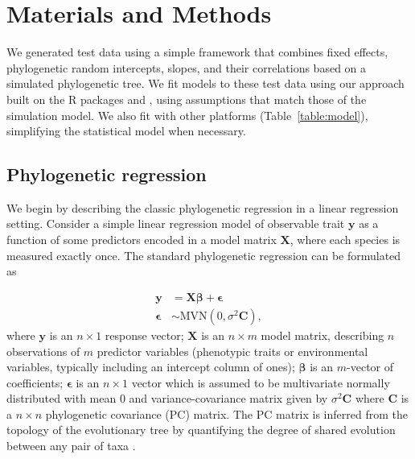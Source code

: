 \documentclass[12pt]{article}
\begin{document}
\section*{Materials and Methods}

\newcommand{\bX}{{\mathbf X}}
\newcommand{\bbeta}{{\boldsymbol \beta}}
\newcommand{\bmu}{{\boldsymbol \mu}}
\newcommand{\bY}{{\mathbf y}}  %
\newcommand{\bC}{{\mathbf C}}
\newcommand{\bZ}{{\mathbf Z}}
\newcommand{\bb}{{\mathbf b}}
\newcommand{\besp}{{\boldsymbol \epsilon}}
\newcommand{\bSigma}{{\boldsymbol \Sigma}}

We generated test data using a simple framework that combines fixed effects, phylogenetic random intercepts, slopes, and their correlations based on a simulated phylogenetic tree.
We fit models to these test data using our approach built on the R packages  \citep{bates2015fitting} and  \citep{brooks2017glmmTMB}, using assumptions that match those of the simulation model. We also fit with other platforms (Table~\ref{table:model}), simplifying the statistical model when necessary.

\subsection*{Phylogenetic regression}

We begin by describing the classic phylogenetic regression in a linear regression setting.
Consider a simple linear regression model of observable trait $\bY$ as a function of some predictors encoded in a model matrix $\bX$, where each species is measured exactly once. 
The standard phylogenetic regression can be formulated as


\begin{equation}
\begin{aligned}
\bY & = \bX \bbeta + \besp  \\
\besp & \sim \textrm{MVN}(0,\sigma^{2} \bC), 
\label{eq:gls}
\end{aligned}
\end{equation}
where $\bY$ is an $n \times 1$ response vector; $\bX$ is an $n \times m$ model matrix, describing $n$ observations of $m$ predictor variables (phenotypic traits or environmental variables, typically including an intercept column of ones); $\bbeta$ is an $m$-vector of coefficients; $\besp$ is an $n \times 1$ vector which is assumed to be multivariate normally distributed with mean $0$ and variance-covariance matrix given by $\sigma^{2} \bC$ where $\bC$ is a $n \times n$ phylogenetic covariance (PC) matrix.
The PC matrix is inferred from the topology of the evolutionary tree by quantifying the degree of shared evolution between any pair of taxa \citep{garamszegi2014modern}.
\end{document}
